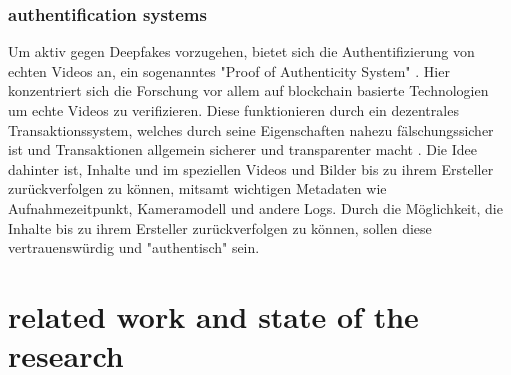 \subsubsection{authentification systems}
Um aktiv gegen Deepfakes vorzugehen, bietet sich die Authentifizierung von echten Videos an, 
ein sogenanntes "Proof of Authenticity System" \cite{gambinDeepfakesCurrentFuture2024}. 
Hier konzentriert sich die Forschung vor allem auf blockchain basierte Technologien um echte Videos zu verifizieren. 
Diese funktionieren durch ein dezentrales Transaktionssystem, 
welches durch seine Eigenschaften nahezu fälschungssicher ist und Transaktionen allgemein sicherer und transparenter macht \cite{gambinDeepfakesCurrentFuture2024}. 
Die Idee dahinter ist, Inhalte und im speziellen Videos und Bilder bis zu ihrem Ersteller zurückverfolgen zu können, 
mitsamt wichtigen Metadaten wie Aufnahmezeitpunkt, Kameramodell und andere Logs. 
Durch die Möglichkeit, die Inhalte bis zu ihrem Ersteller zurückverfolgen zu können, sollen diese vertrauenswürdig und "authentisch" sein.
\section{related work and state of the research}
